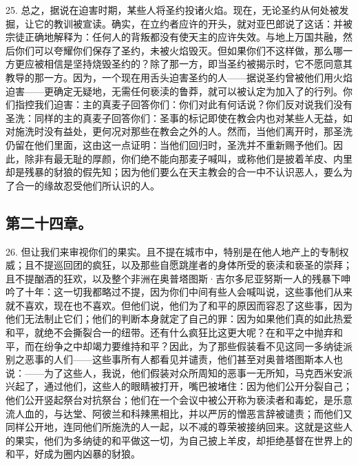25. 总之，据说在迫害时期，某些人将圣约投诸火焰。现在，无论圣约从何处被发掘，让它的教训被宣读。确实，在立约者应许的开头，就对亚巴郎说了这话：并被宗徒正确地解释为：任何人的背叛都没有使天主的应许失效。与地上万国共融，然后你们可以夸耀你们保存了圣约，未被火焰毁灭。但如果你们不这样做，那么哪一方更应被相信是坚持烧毁圣约的？除了那一方，即当圣约被揭示时，它不愿同意其教导的那一方。因为，一个现在用舌头迫害圣约的人——据说圣约曾被他们用火焰迫害——更确定无疑地，无需任何亵渎的鲁莽，就可以被认定为加入了的行列。你们指控我们迫害：主的真麦子回答你们：你们对此有何话说？你们反对说我们没有圣洗：同样的主的真麦子回答你们：圣事的标记即使在教会内也对某些人无益，如对施洗时没有益处，更何况对那些在教会之外的人。然而，当他们离开时，那圣洗仍留在他们里面，这由这一点证明：当他们回归时，圣洗并不重新赐予他们。因此，除非有最无耻的厚颜，你们绝不能向那麦子喊叫，或称他们是披着羊皮、内里却是残暴的豺狼的假先知；因为他们要么在天主教会的合一中不认识恶人，要么为了合一的缘故忍受他们所认识的人。\par


\subsection{第二十四章。}

26. 但让我们来审视你们的果实。且不提在城市中，特别是在他人地产上的专制权威；且不提巡回团的疯狂，以及那些自愿跳崖者的身体所受的亵渎和亵圣的崇拜；且不提酗酒的狂欢，以及整个非洲在奥普塔图斯·吉尔多尼亚努斯一人的残暴下呻吟了十年：这一切我都略过不提，因为你们中间有些人会喊叫说，这些事他们从来就不喜欢，现在也不喜欢。但他们说，他们为了和平的原因而容忍了这些事，因为他们无法制止它们；他们的判断本身就定了自己的罪：因为如果他们真的如此热爱和平，就绝不会撕裂合一的纽带。还有什么疯狂比这更大呢？在和平之中抛弃和平，而在纷争之中却竭力要维持和平？因此，为了那些假装看不见这同一多纳徒派别之恶事的人们——这些事所有人都看见并谴责，他们甚至对奥普塔图斯本人也说：——为了这些人，我说，他们假装对众所周知的恶事一无所知，马克西米安派兴起了，通过他们，这些人的眼睛被打开，嘴巴被堵住：因为他们公开分裂自己；他们公开竖起祭台对抗祭台；他们在一个会议中被公开称为亵渎者和毒蛇，是乐意流人血的，与达堂、阿彼兰和科辣黑相比，并以严厉的憎恶言辞被谴责；而他们又同样公开地，连同他们所施洗的人一起，以不减的尊荣被接纳回来。这就是这些人的果实，他们为多纳徒的和平做这一切，为自己披上羊皮，却拒绝基督在世界上的和平，好成为圈内凶暴的豺狼。\par

